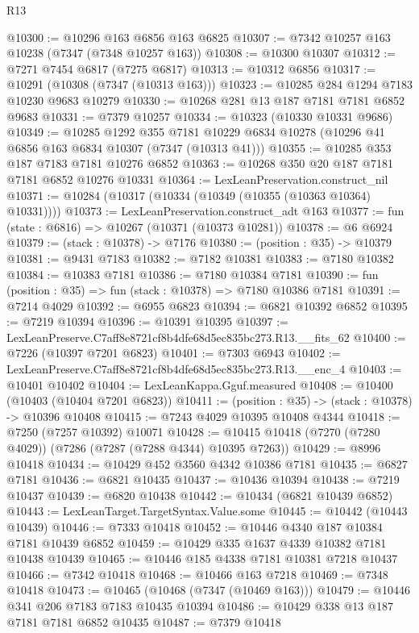 \begin{lexlean}{R13}
\begin{coremodule}
@10300 := @10296 @163 @6856 @163 @6825
@10307 := @7342 @10257 @163 @10238 (@7347 (@7348 @10257 @163))
@10308 := @10300 @10307
@10312 := @7271 @7454 @6817 (@7275 @6817)
@10313 := @10312 @6856
@10317 := @10291 (@10308 (@7347 (@10313 @163)))
@10323 := @10285 @284 @1294 @7183 @10230 @9683 @10279
@10330 := @10268 @281 @13 @187 @7181 @7181 @6852 @9683
@10331 := @7379 @10257
@10334 := @10323 (@10330 @10331 @9686)
@10349 := @10285
    @1292
    @355
    @7181
    @10229
    @6834
    @10278
    (@10296 @41 @6856 @163 @6834 @10307 (@7347 (@10313 @41)))
@10355 := @10285 @353 @187 @7183 @7181 @10276 @6852
@10363 := @10268 @350 @20 @187 @7181 @7181 @6852 @10276 @10331
@10364 := LexLeanPreservation.construct_nil
@10371 := @10284 (@10317 (@10334 (@10349 (@10355 (@10363 @10364) @10331))))
@10373 := LexLeanPreservation.construct_adt @163
@10377 := fun (state : @6816) => @10267 (@10371 (@10373 @10281))
@10378 := @6 @6924
@10379 := (stack : @10378) -> @7176
@10380 := (position : @35) -> @10379
@10381 := @9431 @7183
@10382 := @7182 @10381
@10383 := @7180 @10382
@10384 := @10383 @7181
@10386 := @7180 @10384 @7181
@10390 := fun (position : @35) => fun (stack : @10378) => @7180 @10386 @7181
@10391 := @7214 @4029
@10392 := @6955 @6823
@10394 := @6821 @10392 @6852
@10395 := @7219 @10394
@10396 := @10391 @10395
@10397 := LexLeanPreserve.C7aff8e8721cf8b4dfe68d5ec835bc273.R13.__fits_62
@10400 := @7226 (@10397 @7201 @6823)
@10401 := @7303 @6943
@10402 := LexLeanPreserve.C7aff8e8721cf8b4dfe68d5ec835bc273.R13.__enc_4
@10403 := @10401 @10402
@10404 := LexLeanKappa.Gguf.measured
@10408 := @10400 (@10403 (@10404 @7201 @6823))
@10411 := (position : @35) -> (stack : @10378) -> @10396 @10408
@10415 := @7243 @4029 @10395 @10408 @4344
@10418 := @7250 (@7257 @10392) @10071
@10428 := @10415 @10418 (@7270 (@7280 @4029)) (@7286 (@7287 (@7288 @4344) @10395 @7263))
@10429 := @8996 @10418
@10434 := @10429 @452 @3560 @4342 @10386 @7181
@10435 := @6827 @7181
@10436 := @6821 @10435
@10437 := @10436 @10394
@10438 := @7219 @10437
@10439 := @6820 @10438
@10442 := @10434 (@6821 @10439 @6852)
@10443 := LexLeanTarget.TargetSyntax.Value.some
@10445 := @10442 (@10443 @10439)
@10446 := @7333 @10418
@10452 := @10446 @4340 @187 @10384 @7181 @10439 @6852
@10459 := @10429 @335 @1637 @4339 @10382 @7181 @10438 @10439
@10465 := @10446 @185 @4338 @7181 @10381 @7218 @10437
@10466 := @7342 @10418
@10468 := @10466 @163 @7218
@10469 := @7348 @10418
@10473 := @10465 (@10468 (@7347 (@10469 @163)))
@10479 := @10446 @341 @206 @7183 @7183 @10435 @10394
@10486 := @10429 @338 @13 @187 @7181 @7181 @6852 @10435
@10487 := @7379 @10418

\end{coremodule}
\end{lexlean}
